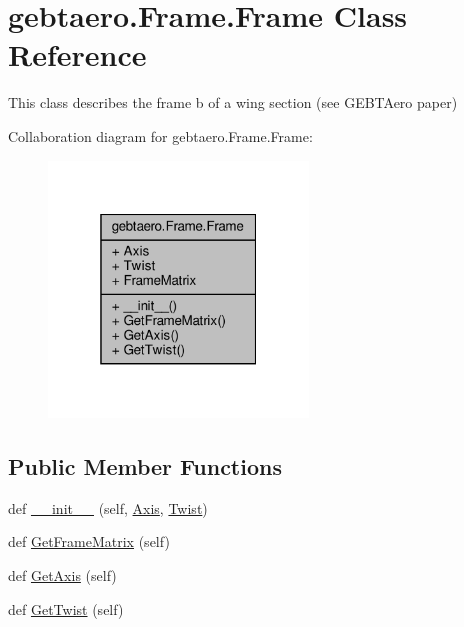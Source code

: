 \hypertarget{classgebtaero_1_1_frame_1_1_frame}{}\section{gebtaero.\+Frame.\+Frame Class Reference}
\label{classgebtaero_1_1_frame_1_1_frame}


This class describes the frame b of a wing section (see G\+E\+B\+T\+Aero paper)  




Collaboration diagram for gebtaero.\+Frame.\+Frame\+:\nopagebreak
\begin{figure}[H]
\begin{center}
\leavevmode
\includegraphics[width=196pt]{classgebtaero_1_1_frame_1_1_frame__coll__graph}
\end{center}
\end{figure}
\subsection*{Public Member Functions}
\begin{DoxyCompactItemize}
\item 
def \hyperlink{classgebtaero_1_1_frame_1_1_frame_a39d919d9d67030dafbe8a4cf44ea53d5}{\+\_\+\+\_\+init\+\_\+\+\_\+} (self, \hyperlink{classgebtaero_1_1_frame_1_1_frame_ae08a3f5d573566b87a5a3f206d312a47}{Axis}, \hyperlink{classgebtaero_1_1_frame_1_1_frame_ab64cc356fbc0c271e985c7d6694e31bc}{Twist})
\item 
def \hyperlink{classgebtaero_1_1_frame_1_1_frame_a4c00a12dd5023ac5220c863d9b806da0}{Get\+Frame\+Matrix} (self)
\item 
def \hyperlink{classgebtaero_1_1_frame_1_1_frame_a72f88d5e0ae61e459545178d564caaf6}{Get\+Axis} (self)
\item 
def \hyperlink{classgebtaero_1_1_frame_1_1_frame_aaf3d8c0081afde32def48d733d95d3a9}{Get\+Twist} (self)
\end{DoxyCompactItemize}
